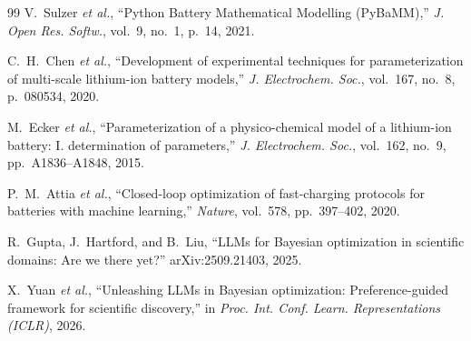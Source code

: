 \documentclass[journal]{IEEEtran}
\begin{document}
\begin{thebibliography}{99}
V.~Sulzer \textit{et al.}, ``Python Battery Mathematical Modelling (PyBaMM),''
\textit{J. Open Res. Softw.}, vol.~9, no.~1, p.~14, 2021.

C.~H.~Chen \textit{et al.}, ``Development of experimental techniques for
parameterization of multi-scale lithium-ion battery models,''
\textit{J. Electrochem. Soc.}, vol.~167, no.~8, p.~080534, 2020.

M.~Ecker \textit{et al.}, ``Parameterization of a physico-chemical model of a
lithium-ion battery: I. determination of parameters,''
\textit{J. Electrochem. Soc.}, vol.~162, no.~9, pp.~A1836--A1848, 2015.

P.~M.~Attia \textit{et al.}, ``Closed-loop optimization of fast-charging
protocols for batteries with machine learning,'' \textit{Nature}, vol.~578,
pp.~397--402, 2020.

R.~Gupta, J.~Hartford, and B.~Liu, ``LLMs for Bayesian optimization in
scientific domains: Are we there yet?'' arXiv:2509.21403, 2025.

X.~Yuan \textit{et al.}, ``Unleashing LLMs in Bayesian optimization:
Preference-guided framework for scientific discovery,'' in
\textit{Proc. Int. Conf. Learn. Representations (ICLR)}, 2026.

\end{thebibliography}
\end{document}
